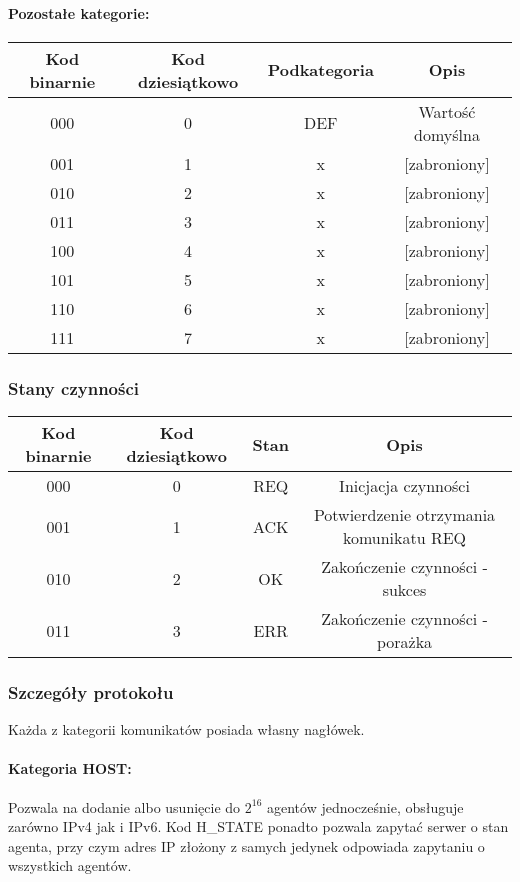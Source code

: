 \documentclass[10pt,a4paper]{article}
\begin{document}
				\paragraph{Pozostałe kategorie:\\}
				
				\begin{tabular}{ c | c | c | c }
				    \textbf{Kod binarnie} & \textbf{Kod dziesiątkowo} & \textbf{Podkategoria} & \textbf{Opis} \\
				    \hline
				    000 & 0 & DEF & Wartość domyślna \\
				    001 & 1 & x & [zabroniony] \\
				    010 & 2 & x & [zabroniony] \\
				    011 & 3 & x & [zabroniony] \\
				    100 & 4 & x & [zabroniony] \\
				    101 & 5 & x & [zabroniony] \\
				    110 & 6 & x & [zabroniony] \\
				    111 & 7 & x & [zabroniony] \\
				\end{tabular}
		        
	        \subsubsection{Stany czynności}
		        \begin{tabular}{ c | c | c | c }
				    \textbf{Kod binarnie} & \textbf{Kod dziesiątkowo} & \textbf{Stan} & \textbf{Opis} \\
				    \hline
				    000 & 0 & REQ & Inicjacja czynności \\
				    001 & 1 & ACK & Potwierdzenie otrzymania komunikatu REQ \\
				    010 & 2 & OK & Zakończenie czynności - sukces \\
				    011 & 3 & ERR & Zakończenie czynności - porażka \\
				\end{tabular}
				
        \subsubsection{Szczegóły protokołu}
            Każda z kategorii komunikatów posiada własny nagłówek.
            
            \paragraph{Kategoria HOST:\\}
            Pozwala na dodanie albo usunięcie do $2^{16}$ agentów jednocześnie, obsługuje zarówno IPv4 jak i IPv6. Kod H\_STATE ponadto pozwala zapytać serwer o stan agenta, przy czym adres IP złożony z samych jedynek odpowiada zapytaniu o wszystkich agentów.
            
\end{document}
